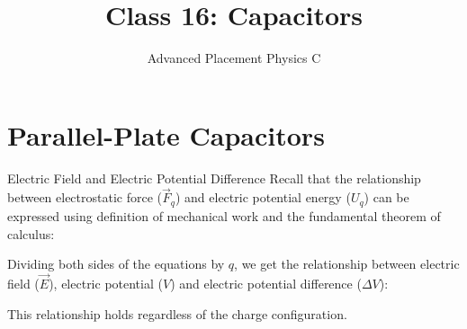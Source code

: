 \documentclass[12pt,aspectratio=169]{beamer}
\title{Class 16: Capacitors}
\subtitle{Advanced Placement Physics C}
\begin{document}
\begin{frame}
  \maketitle
\end{frame}


\section{Parallel-Plate Capacitors}

\begin{frame}{Electric Field and Electric Potential Difference}
  Recall that the relationship between electrostatic force ($\vec F_q$) and
  electric potential energy ($U_q$) can be expressed using definition of
  mechanical work and the fundamental theorem of calculus:


  \vspace{-.08in}Dividing both sides of the equations by $q$, we get the
  relationship between electric field ($\vec E$), electric potential ($V$) and
  electric potential difference ($\Delta V$):
  

  This relationship holds regardless of the charge configuration.
\end{frame}
\end{document}
